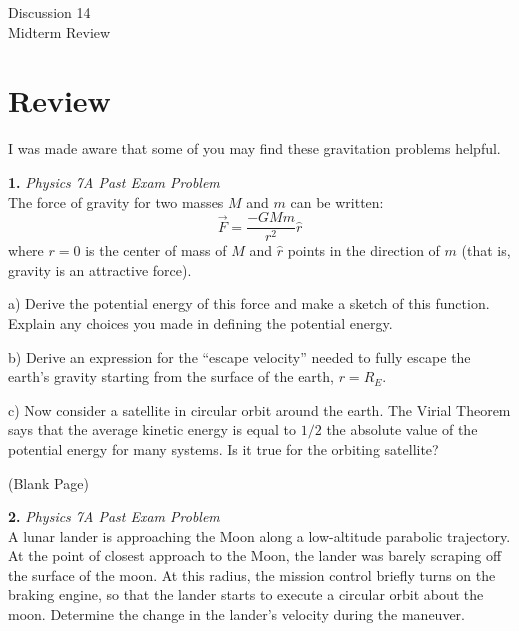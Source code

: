 \documentclass[11pt]{article}
\theoremstyle{gangnamstyle}{\newtheorem{definition}{Definition}[]}
\theoremstyle{gangnamstyle}{\newtheorem{example}{Example}[]}
\theoremstyle{gangnamstyle}{\newtheorem{problem}{Problem}[]}
\begin{document}
\normalfont
\pagestyle{pages}


\begin{center}
\vspace{3in}
{\Large Discussion 14 } \\ [0.05in]
Midterm Review \\ [-0.5in]
\end{center}

\section{Review}

I was made aware that some of you may find these gravitation problems helpful. 



\textbf{1.} \textit{Physics 7A Past Exam Problem} \\
The force of gravity for two masses $M$ and $m$ can be written:
\[ \Vec{F} = \frac{-GMm}{r^2} \hat{r} \]
where $r = 0$ is the center of mass of $M$ and $\hat{r}$ points in the direction of $m$ (that is, gravity is an attractive force).

a) Derive the potential energy of this force and make a sketch of this function. Explain any choices you made in defining the potential energy. 

b) Derive an expression for the “escape velocity” needed to fully escape the earth’s gravity starting from the surface of the earth, $r = R_E$. 

c) Now consider a satellite in circular orbit around the earth. The Virial Theorem says that the average kinetic energy is equal to $1/2$ the absolute value of the potential energy for many systems. Is it true for the orbiting satellite? 

\pagebreak

\begin{center}
(Blank Page)
\end{center}

\pagebreak

\textbf{2.} \textit{Physics 7A Past Exam Problem} \\
A lunar lander is approaching the Moon along a low-altitude parabolic trajectory. At the point of closest approach to the Moon, the lander was barely scraping off the surface of the moon. At this radius, the mission control briefly turns on the braking engine, so that the lander starts to execute a circular orbit about the moon. Determine the change in the lander’s velocity during the maneuver. 
\end{document}

